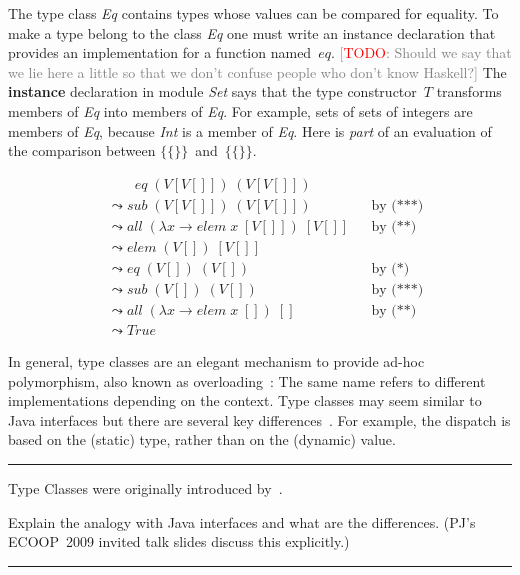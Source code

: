 \documentclass[conference,compsoc]{IEEEtran}
\newcommand{\todo}[1]{{\small \textcolor{gray}{[\textcolor{red}{TODO}: #1]}}}
\newenvironment{notes}{\medskip\hrule\nobreak\smallskip\narrower}{\smallskip\hrule\medskip}
\begin{document}

The type class \textit{Eq} contains types whose values can be compared for
equality. To make a type belong to the class \textit{Eq} one must write an
instance declaration that provides an implementation for a function
named~$eq$. \todo{Should we say that we lie here a little so that we don't
confuse people who don't know Haskell?} The \textbf{instance} declaration
in module \textit{Set} says that the type constructor~$T$ transforms
members of \textit{Eq} into members of \textit{Eq}. For example, sets of
sets of integers are members of \textit{Eq}, because \textit{Int} is a
member of \textit{Eq}. Here is \emph{part} of an evaluation of the
comparison between $\{\{\}\}$~and~$\{\{\}\}$.

\begin{align*}
&\phantom{\;\leadsto\;}
  \mathit{eq}\;(V[V[]])\;(V[V[]]) \\
&\leadsto
  \mathit{sub}\;(V[V[]])\;(V[V[]])
  &&\text{by (***)}\\
&\leadsto
  \mathit{all}\;(\lambda x\to\mathit{elem}\;x\;[V[]])\;[V[]]
  &&\text{by (**)}\\
&\leadsto
  \mathit{elem}\;(V[])\;[V[]]\\
&\leadsto
  \mathit{eq}\;(V[])\;(V[])
  &&\text{by (*)}\\
&\leadsto
  \mathit{sub}\;(V[])\;(V[])
  &&\text{by (***)}\\
&\leadsto
  \mathit{all}\;(\lambda x\to\mathit{elem}\;x\;[])\;[]
  &&\text{by (**)}\\
&\leadsto
  \mathit{True}
\end{align*}

In general, type classes are an elegant mechanism to provide ad-hoc
polymorphism, also known as overloading~\cite{DBLP:conf/popl/WadlerB89}:
The same name refers to different implementations depending on the context.
Type classes may seem similar to Java interfaces but there are several key
differences~\cite{WEB:PJ-tc}. For example, the dispatch is based on the
(static) type, rather than on the (dynamic) value.

\begin{notes}
Type Classes were originally introduced by~\cite{DBLP:conf/popl/WadlerB89}.

Explain the analogy with Java interfaces and what are the differences.
(PJ's ECOOP~2009 invited talk slides discuss this explicitly.)
\end{notes}
\end{document}
